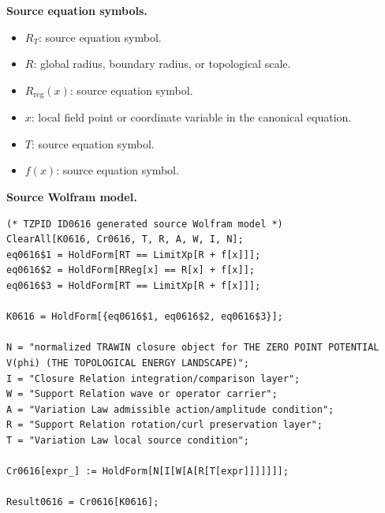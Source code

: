 \begin{minipage}[t]{0.49\linewidth}
\begingroup
\small
\raggedright
\textbf{Source equation symbols.}\par
\begin{itemize}[leftmargin=1.35em,itemsep=1pt,topsep=1pt,parsep=0pt]
    \item $R_T$: source equation symbol.
    \item $R$: global radius, boundary radius, or topological scale.
    \item $R_{\mathrm{reg}}(x)$: source equation symbol.
    \item $x$: local field point or coordinate variable in the canonical equation.
    \item $T$: source equation symbol.
    \item $f(x)$: source equation symbol.
\end{itemize}
\endgroup
\end{minipage}\hfill
\begin{minipage}[t]{0.47\linewidth}
\begingroup
\scriptsize
\raggedright
\textbf{Source Wolfram model.}\par
\begin{Verbatim}[fontsize=\tiny,breaklines=true,breakanywhere=true]
(* TZPID ID0616 generated source Wolfram model *)
ClearAll[K0616, Cr0616, T, R, A, W, I, N];
eq0616$1 = HoldForm[RT == LimitXp[R + f[x]]];
eq0616$2 = HoldForm[RReg[x] == R[x] + f[x]];
eq0616$3 = HoldForm[RT == LimitXp[R + f[x]]];

K0616 = HoldForm[{eq0616$1, eq0616$2, eq0616$3}];

N = "normalized TRAWIN closure object for THE ZERO POINT POTENTIAL V(phi) (THE TOPOLOGICAL ENERGY LANDSCAPE)";
I = "Closure Relation integration/comparison layer";
W = "Support Relation wave or operator carrier";
A = "Variation Law admissible action/amplitude condition";
R = "Support Relation rotation/curl preservation layer";
T = "Variation Law local source condition";

Cr0616[expr_] := HoldForm[N[I[W[A[R[T[expr]]]]]]];

Result0616 = Cr0616[K0616];
\end{Verbatim}
\endgroup
\end{minipage}

